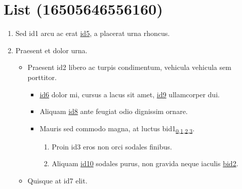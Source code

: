 \section{List (16505646556160)}
\label{\detokenize{test:list-16505646556160}}\begin{enumerate}
%
\item {} 
\sphinxAtStartPar
Sed \hypertarget{\detokenize{id1}}{id1} arcu ac erat \hyperlink{\detokenize{id5}}{id5}, a placerat urna rhoncus.

\item {} 
\sphinxAtStartPar
Praesent et dolor urna.
\begin{itemize}
\item {} 
\sphinxAtStartPar
Praesent \hypertarget{\detokenize{id2}}{id2} libero ac turpis condimentum, vehicula vehicula sem porttitor.
\begin{itemize}
\item {} 
\sphinxAtStartPar
\hyperlink{\detokenize{id6}}{id6} dolor mi, cursus a lacus sit amet, \hyperlink{\detokenize{id9}}{id9} ullamcorper dui.

\item {} 
\sphinxAtStartPar
Aliquam \hyperlink{\detokenize{id8}}{id8} ante feugiat odio dignissim ornare.

\item {} 
\sphinxAtStartPar
Mauris sed commodo magna, at luctus \hypertarget{\detokenize{bid1}}{bid1}\texorpdfstring{\textsubscript{\hyperlink{\detokenize{bid1-ref4}}{0},\hyperlink{\detokenize{bid1-ref20}}{1},\hyperlink{\detokenize{bid1-ref28}}{2},\hyperlink{\detokenize{bid1-ref38}}{3}}}{}.
\begin{enumerate}
%
\item {} 
\sphinxAtStartPar
Proin \hypertarget{\detokenize{id3}}{id3} eros non orci sodales finibus.

\item {} 
\sphinxAtStartPar
Aliquam \hyperlink{\detokenize{id10}}{id10} sodales purus, non gravida neque iaculis \hyperlink{\detokenize{bid2}}{\hypertarget{\detokenize{bid2-ref15}}{bid2}}.

\end{enumerate}

\end{itemize}

\item {} 
\sphinxAtStartPar
Quisque at \hypertarget{\detokenize{id7}}{id7} elit.


\end{itemize}
\end{enumerate}
